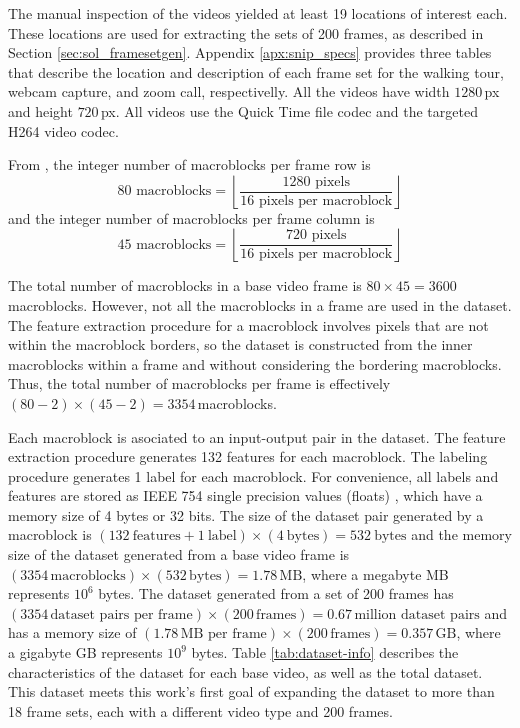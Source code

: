 The manual inspection of the videos yielded at least 19 locations of interest each. These locations are used for extracting the sets of 200 frames, as described in Section \ref{sec:sol_framesetgen}. Appendix \ref{apx:snip_specs} provides three tables that describe the location and description of each frame set for the walking tour, webcam capture, and zoom call, respectivelly. All the videos have width $1280\,$px and height $720\,$px. All videos use the Quick Time file codec and the targeted H264 video codec.

From , the integer number of macroblocks per frame row is
\begin{equation}
  80\text{ macroblocks} = \left\lfloor\frac{1280\text{ pixels}}{16\text{ pixels per macroblock}}\right\rfloor
\end{equation}
and the integer number of macroblocks per frame column is
\begin{equation}
  45\text{ macroblocks} = \left\lfloor\frac{720\text{ pixels}}{16\text{ pixels per macroblock}}\right\rfloor
\end{equation}

The total number of macroblocks in a base video frame is $80\times45=3600\,$macroblocks. However, not all the macroblocks in a frame are used in the dataset. The feature extraction procedure for a macroblock involves pixels that are not within the macroblock borders, so the dataset is constructed from the inner macroblocks within a frame and without considering the bordering macroblocks. Thus, the total number of macroblocks per frame is effectively $(80-2)\times(45-2)=3354\,$macroblocks.

Each macroblock is asociated to an input-output pair in the dataset. The feature extraction procedure generates 132 features for each macroblock. The labeling procedure generates 1 label for each macroblock. For convenience, all labels and features are stored as IEEE 754 single precision values (floats) \cite{Ieee2019}, which have a memory size of 4 bytes or 32 bits. The size of the dataset pair generated by a macroblock is $(132\ \text{features}+1\ \text{label})\times(4\ \text{bytes})=532\ \text{bytes}$ and the memory size of the dataset generated from a base video frame is $(3354\,\text{macroblocks})\times(532\,\text{bytes}) = 1.78\,\text{MB}$, where a megabyte MB represents $10^6$ bytes. The dataset generated from a set of 200 frames has $(3354\,\text{dataset pairs per frame})\times(200\,\text{frames}) = 0.67\,\text{million dataset pairs}$ and has a memory size of $(1.78\,\text{MB per frame})\times(200\,\text{frames}) = 0.357\,\text{GB}$, where a gigabyte GB represents $10^9$ bytes. Table \ref{tab:dataset-info} describes the characteristics of the dataset for each base video, as well as the total dataset. This dataset meets this work's first goal of expanding the dataset to more than 18 frame sets, each with a different video type and 200 frames.


